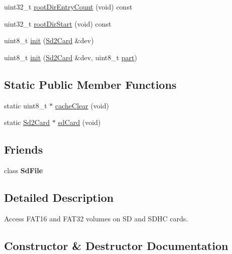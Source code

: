 \begin{DoxyCompactItemize}
\item 
uint32\+\_\+t \hyperlink{class_sd_volume_a27b5b8b8e167d28d14afa25c55037f92}{root\+Dir\+Entry\+Count} (void) const 
\item 
uint32\+\_\+t \hyperlink{class_sd_volume_a5ea7bb3b2072b952c11b5614f1e69866}{root\+Dir\+Start} (void) const 
\item 
uint8\+\_\+t \hyperlink{class_sd_volume_a037defc7dc23b38ee7ddf7b5273aea5a}{init} (\hyperlink{class_sd2_card}{Sd2\+Card} \&dev)
\item 
uint8\+\_\+t \hyperlink{class_sd_volume_a51d8b4c5dd7372eb7dec486472139eb5}{init} (\hyperlink{class_sd2_card}{Sd2\+Card} \&dev, uint8\+\_\+t \hyperlink{_fat_structs_8h_aa65f87792f271fc6cfa70980af6ac3dd}{part})
\end{DoxyCompactItemize}
\subsection*{Static Public Member Functions}
\begin{DoxyCompactItemize}
\item 
static uint8\+\_\+t $\ast$ \hyperlink{class_sd_volume_aaf5b7f148ad45424bf6d20af4f082a13}{cache\+Clear} (void)
\item 
static \hyperlink{class_sd2_card}{Sd2\+Card} $\ast$ \hyperlink{class_sd_volume_a6bc465a30e167d8d440eb3cda194ee79}{sd\+Card} (void)
\end{DoxyCompactItemize}
\subsection*{Friends}
\begin{DoxyCompactItemize}
\item 
\hypertarget{class_sd_volume_ad89809cf54bdf885b0505e5edeff2049}{}class {\bfseries Sd\+File}\label{class_sd_volume_ad89809cf54bdf885b0505e5edeff2049}

\end{DoxyCompactItemize}


\subsection{Detailed Description}
Access F\+A\+T16 and F\+A\+T32 volumes on S\+D and S\+D\+H\+C cards. 

\subsection{Constructor \& Destructor Documentation}
\hypertarget{class_sd_volume_a1843d58062920d6d0e122892ffa42923}{}
